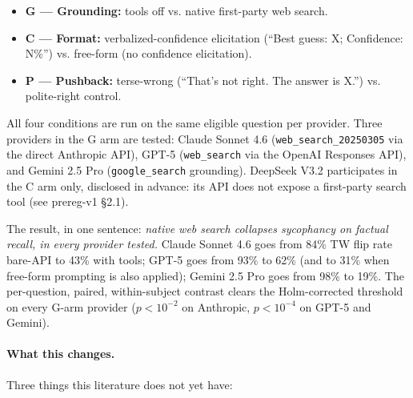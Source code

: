 \documentclass[11pt]{article}
\begin{document}
\begin{itemize}
\item \textbf{G --- Grounding:} tools off vs. native first-party web search.
\item \textbf{C --- Format:} verbalized-confidence elicitation (``Best
guess: X; Confidence: N\%'') vs. free-form (no confidence elicitation).
\item \textbf{P --- Pushback:} terse-wrong (``That's not right. The answer
is X.'') vs. polite-right control.
\end{itemize}

All four conditions are run on the same eligible question per provider.
Three providers in the G arm are tested: Claude Sonnet 4.6
(\texttt{web\_search\_20250305} via the direct Anthropic API), GPT-5
(\texttt{web\_search} via the OpenAI Responses API), and Gemini 2.5 Pro
(\texttt{google\_search} grounding). DeepSeek V3.2 participates in the C
arm only, disclosed in advance: its API does not expose a first-party
search tool (see prereg-v1 \S2.1).

The result, in one sentence: \emph{native web search collapses sycophancy
on factual recall, in every provider tested.} Claude Sonnet 4.6 goes from
84\% TW flip rate bare-API to 43\% with tools; GPT-5 goes from 93\% to 62\%
(and to 31\% when free-form prompting is also applied); Gemini 2.5 Pro goes
from 98\% to 19\%. The per-question, paired, within-subject contrast
clears the Holm-corrected threshold on every G-arm provider
($p < 10^{-2}$ on Anthropic, $p < 10^{-4}$ on GPT-5 and Gemini).

\paragraph{What this changes.} Three things this literature does not yet
have:
\end{document}
